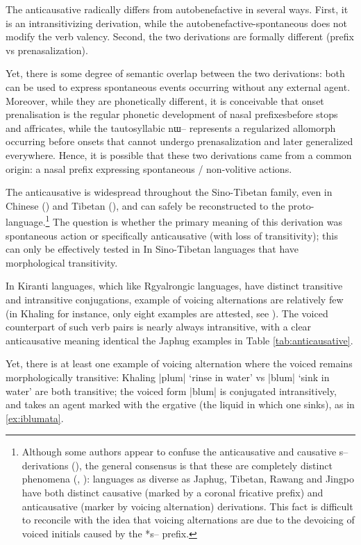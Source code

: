 \documentclass[oldfontcommands,oneside,a4paper,11pt]{article}
\newcommand{\ipa}[1]{{\phon \mbox{#1}}} %
\begin{document}
The anticausative radically differs from autobenefactive in several ways. First, it is an intransitivizing derivation, while the autobenefactive-spontaneous does not modify the verb valency. Second, the two derivations are formally different (prefix vs prenasalization). 

Yet, there is some degree of semantic overlap between the two derivations: both can be used to express spontaneous events occurring without any external agent. Moreover, while they are phonetically different, it is conceivable that onset prenalisation is the regular phonetic development of nasal prefixesbefore stops and affricates, while the tautosyllabic \ipa{nɯ--} represents a regularized allomorph occurring before onsets that cannot undergo prenasalization and later generalized everywhere. Hence, it is possible that these two derivations came from a common origin: a nasal prefix expressing spontaneous / non-volitive actions. 

The anticausative is widespread throughout the Sino-Tibetan family, even in Chinese (\citealt{sagart12sprefix}) and Tibetan (\citealt{jacques12internal}), and can safely be reconstructed to the proto-language.\footnote{Although some authors appear to  confuse the anticausative and causative \ipa{s--} derivations (\citealt{mei12caus}), the general consensus is that these are completely distinct phenomena (\citealt{lapolla03}, \citealt{hill14voicing}): languages as diverse as  Japhug, Tibetan, Rawang and Jingpo have both distinct causative (marked by a coronal fricative prefix) and anticausative (marker by voicing alternation) derivations. This fact is difficult to reconcile with the idea that voicing alternations are due to the devoicing of voiced initials caused by the *\ipa{s--} prefix.} The question is whether the primary meaning of this derivation was spontaneous action or specifically anticausative (with loss of transitivity); this can only be effectively tested in 
In Sino-Tibetan languages that have  morphological transitivity.

In Kiranti languages, which like Rgyalrongic languages, have distinct transitive and intransitive conjugations, example of voicing alternations are relatively few (in Khaling for instance, only eight examples are attested, see \citealt{jacques13derivational.khaling}). The voiced counterpart of such verb pairs is nearly always intransitive, with a clear anticausative meaning identical the Japhug examples in Table \ref{tab:anticausative}.


Yet, there is at least one example of voicing alternation where the voiced remains morphologically transitive: Khaling \ipa{|plum|} `rinse in water' vs \ipa{|blum|} `sink in water' are both transitive; the voiced form \ipa{|blum|} is conjugated intransitively, and takes an agent marked with the ergative (the liquid in which one sinks), as in \ref{ex:iblumata}.
\end{document}
